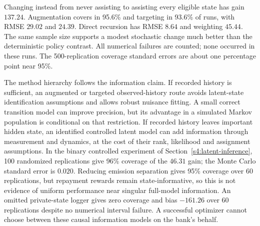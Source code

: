 Changing instead from never assisting to assisting every eligible state
has gain $137.24$. Augmentation covers in 95.6\% and targeting in 93.6\%
of runs, with RMSE $29.02$ and $24.39$. Direct recursion has RMSE $8.64$
and weighting $45.44$. The same sample size supports a modest stochastic
change much better than the deterministic policy contrast. All numerical
failures are counted; none occurred in these runs. The 500-replication
coverage standard errors are about one percentage point near 95\%.

The method hierarchy follows the information claim. If recorded history
is sufficient, an augmented or targeted observed-history route avoids
latent-state identification assumptions and allows robust nuisance fitting.
A small correct transition model can improve precision, but its advantage
in a simulated Markov population is conditional on that restriction.
If recorded history leaves important hidden state, an identified controlled
latent model can add information through measurement and dynamics, at the
cost of their rank, likelihood and assignment assumptions. In the binary
controlled experiment of Section~\ref{s4:latent-inference}, 100 randomized
replications give 96\% coverage of the $46.31$ gain; the Monte Carlo
standard error is $0.020$. Reducing emission separation gives 95\% coverage
over 60 replications, but repayment rewards remain state-informative, so
this is not evidence of uniform performance near singular full-model
information. An omitted private-state logger gives zero coverage and
bias $-161.26$ over 60 replications despite no numerical interval failure.
A successful optimizer cannot choose between these causal information
models on the bank's behalf.


